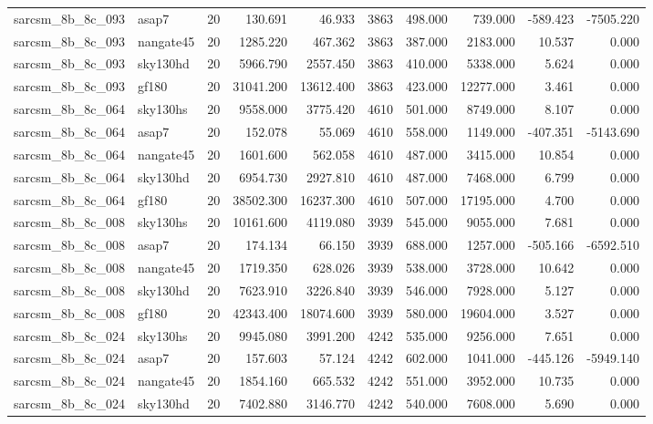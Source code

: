 \documentclass{article}
\begin{document}
\begin{longtable}{llrrrrrrrr}
sarcsm\_8b\_8c\_093 & asap7 & 20 & 130.691 & 46.933 & 3863 & 498.000 & 739.000 & -589.423 & -7505.220 \\
sarcsm\_8b\_8c\_093 & nangate45 & 20 & 1285.220 & 467.362 & 3863 & 387.000 & 2183.000 & 10.537 & 0.000 \\
sarcsm\_8b\_8c\_093 & sky130hd & 20 & 5966.790 & 2557.450 & 3863 & 410.000 & 5338.000 & 5.624 & 0.000 \\
sarcsm\_8b\_8c\_093 & gf180 & 20 & 31041.200 & 13612.400 & 3863 & 423.000 & 12277.000 & 3.461 & 0.000 \\
sarcsm\_8b\_8c\_064 & sky130hs & 20 & 9558.000 & 3775.420 & 4610 & 501.000 & 8749.000 & 8.107 & 0.000 \\
sarcsm\_8b\_8c\_064 & asap7 & 20 & 152.078 & 55.069 & 4610 & 558.000 & 1149.000 & -407.351 & -5143.690 \\
sarcsm\_8b\_8c\_064 & nangate45 & 20 & 1601.600 & 562.058 & 4610 & 487.000 & 3415.000 & 10.854 & 0.000 \\
sarcsm\_8b\_8c\_064 & sky130hd & 20 & 6954.730 & 2927.810 & 4610 & 487.000 & 7468.000 & 6.799 & 0.000 \\
sarcsm\_8b\_8c\_064 & gf180 & 20 & 38502.300 & 16237.300 & 4610 & 507.000 & 17195.000 & 4.700 & 0.000 \\
sarcsm\_8b\_8c\_008 & sky130hs & 20 & 10161.600 & 4119.080 & 3939 & 545.000 & 9055.000 & 7.681 & 0.000 \\
sarcsm\_8b\_8c\_008 & asap7 & 20 & 174.134 & 66.150 & 3939 & 688.000 & 1257.000 & -505.166 & -6592.510 \\
sarcsm\_8b\_8c\_008 & nangate45 & 20 & 1719.350 & 628.026 & 3939 & 538.000 & 3728.000 & 10.642 & 0.000 \\
sarcsm\_8b\_8c\_008 & sky130hd & 20 & 7623.910 & 3226.840 & 3939 & 546.000 & 7928.000 & 5.127 & 0.000 \\
sarcsm\_8b\_8c\_008 & gf180 & 20 & 42343.400 & 18074.600 & 3939 & 580.000 & 19604.000 & 3.527 & 0.000 \\
sarcsm\_8b\_8c\_024 & sky130hs & 20 & 9945.080 & 3991.200 & 4242 & 535.000 & 9256.000 & 7.651 & 0.000 \\
sarcsm\_8b\_8c\_024 & asap7 & 20 & 157.603 & 57.124 & 4242 & 602.000 & 1041.000 & -445.126 & -5949.140 \\
sarcsm\_8b\_8c\_024 & nangate45 & 20 & 1854.160 & 665.532 & 4242 & 551.000 & 3952.000 & 10.735 & 0.000 \\
sarcsm\_8b\_8c\_024 & sky130hd & 20 & 7402.880 & 3146.770 & 4242 & 540.000 & 7608.000 & 5.690 & 0.000 \\

\end{longtable}
\end{document}
